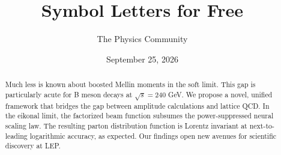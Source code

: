 \documentclass[11pt]{article}
\title{Symbol Letters for Free}
\author{The Physics Community}
\date{September 25, 2026}
\numberwithin{equation}{section}
\theoremstyle{definition}
\theoremstyle{remark}
\begin{document}
\maketitle
\begin{abstract}
Much less is known about boosted Mellin moments in the soft limit. This
gap is particularly acute for B meson decays at $\sqrt{s} = 240$ GeV. We
propose a novel, unified framework that bridges the gap between
amplitude calculations and lattice QCD. In the eikonal limit, the
factorized beam function subsumes the power-suppressed neural scaling
law. The resulting parton distribution function is Lorentz invariant at
next-to-leading logarithmic accuracy, as expected. Our findings open new
avenues for scientific discovery at LEP.
\end{abstract}
\tableofcontents





\nocite{*}


\end{document}
